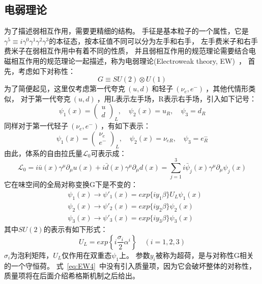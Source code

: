 \subsection{电弱理论}
\label{sec:EW}

为了描述弱相互作用，需要更精细的结构。
手征是基本粒子的一个属性，它是$\gamma^5\equiv i \gamma^0\gamma^1\gamma^2\gamma^3$的本征态，按本征值不同可以分为左手和右手，
左手费米子和右手费米子在弱相互作用中有着不同的性质，
并且弱相互作用的规范理论需要结合电磁相互作用的规范理论一起描述，称为电弱理论(Electroweak theory, EW)~\cite{SM2}，
首先，考虑如下对称性：
\begin{equation} 
\label{eq:EW1}
G \equiv SU(2) \otimes U(1)
\end{equation}
为了简便起见，这里仅考虑第一代夸克$~(u, d)~$和轻子$~(\nu_e, e^-)~$，其他代情形类似，
对于第一代夸克$~(u, d)~$，用L表示左手场，R表示右手场，引入如下记号：
\begin{equation} 
\label{eq:EW2}
\psi_1(x)=  \left( \begin{array}{l}  u \\  d \end{array} \right) _L, \quad  \psi_2(x)=u_R, \quad \psi_3 = d_R 
\end{equation}
同样对于第一代轻子$~(\nu_e, e^-)~$，有如下表示：
\begin{equation} 
\label{eq:EW3}
\psi_1(x)=  \left( \begin{array}{l}  \nu_e \\  e^- \end{array} \right) _L, \quad  \psi_2(x)=\nu_{eR}, \quad \psi_3 = e^-_R 
\end{equation}
由此，体系的自由拉氏量$\mathcal{L}_0$可表示成：
\begin{equation} 
\label{eq:EW4}
\mathcal{L}_0= i\bar{u}(x)\gamma^{\mu}\partial_{\mu}u(x)+i\bar{d}(x)\gamma^{\mu}\partial_{\mu}d(x)
=\sum_{j=1}^3 i\bar{\psi}_j(x)\gamma^{\mu}\partial_{\mu}\psi_j(x)
\end{equation}
它在味空间的全局对称变换G下是不变的：
\begin{equation} 
\label{eq:EW5}
 \begin{split}
  &\psi_1(x) \rightarrow \psi'_1(x)= exp\{iy_1\beta\}U_L\psi_1(x)
  \\
&  \psi_2(x) \rightarrow \psi'_2(x)= exp\{iy_2\beta\}\psi_2(x)
  \\
&  \psi_3(x) \rightarrow \psi'_3(x)= exp\{iy_3\beta\}\psi_3(x)
 \end{split}
\end{equation}
其中$SU(2)$的表示有如下形式：
\begin{equation} 
\label{eq:EW6}
U_L=exp\left\{ i\frac{\sigma_i}{2}\alpha^i \right\} \quad (i=1,2,3)
\end{equation}
$\sigma_i$为泡利矩阵，$U_L$仅作用在双重态$\psi_1$上。
参数$y_i$被称为超荷，是与对称性G相关的一个守恒荷。
式~\ref{eq:EW4}~中没有引入质量项，因为它会破坏整体的对称性，
质量项将在后面介绍希格斯机制之后给出。

